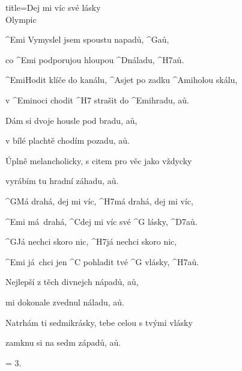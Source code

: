 \begin{song}{title=\predtitle\centering Dej mi víc své lásky \\\large Olympic  \vspace*{-0.3cm}}  %
\begin{centerjustified}
\nejnejvetsi

\sloka
	^{Emi \z}Vymyslel jsem spoustu napadů, ^{G}aů,
   
	co ^{Emi \z}podporujou hloupou ^{\z D}náladu, ^{H7}aů.

	^{Emi}Hodit klíče do kanálu, ^{A}sjet po zadku ^{Ami}holou skálu,

	v ^{Emi}noci chodit ^{H7 \z}strašit do ^{\z Emi}hradu, aů.

\sloka
	Dám si dvoje housle pod bradu, aů,

	v bílé plachtě chodím pozadu, aů.
	
	Úplně melancholicky, s citem pro věc jako vždycky

	vyrábím tu hradní záhadu, aů.

	^{G}Má drahá, dej mi víc, ^{H7}má drahá, dej mi víc,

	^{Emi \z}má~drahá, ^{C}dej mi víc své ^{G \z}lásky, ^{D7}aů.

	^{G}Já nechci skoro nic, ^{H7}já nechci skoro nic,

	^{Emi \z}já~chci jen ^{C \z}pohladit tvé ^{G \z}vlásky, ^{H7}aů.

\sloka
	Nejlepší z těch divnejch nápadů, aů,
	
	mi dokonale zvednul náladu, aů.

	Natrhám ti sedmikrásky, tebe celou s tvými vlásky

	zamknu si na sedm západů, aů.


\sloka = 3.

\end{centerjustified}

\centering
{}

\setcounter{Slokočet}{0}
\end{song}
